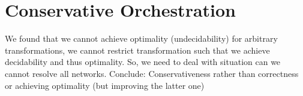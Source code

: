 







\section{Conservative Orchestration}
We found that we cannot achieve optimality (undecidability) for arbitrary transformations, we cannot restrict transformation such that we achieve decidability and thus optimality.
So, we need to deal with situation can we cannot resolve all networks.
Conclude: Conservativeness rather than correctness or achieving optimality (but improving the latter one)



